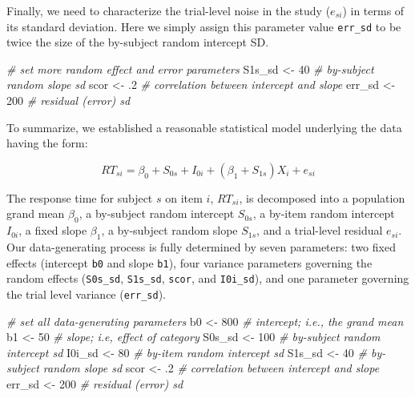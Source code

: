\documentclass[doc,floatsintext]{apa6}
\newenvironment{Shaded}{\begin{snugshade}}{\end{snugshade}}
\newcommand{\DecValTok}[1]{\textcolor[rgb]{0.00,0.00,0.81}{#1}}
\newcommand{\FloatTok}[1]{\textcolor[rgb]{0.00,0.00,0.81}{#1}}
\newcommand{\StringTok}[1]{\textcolor[rgb]{0.31,0.60,0.02}{#1}}
\newcommand{\CommentTok}[1]{\textcolor[rgb]{0.56,0.35,0.01}{\textit{#1}}}
\newcommand{\NormalTok}[1]{#1}
\begin{document}
Finally, we need to characterize the trial-level noise in the study
(\(e_{si}\)) in terms of its standard deviation. Here we simply assign
this parameter value \texttt{err\_sd} to be twice the size of the
by-subject random intercept SD.

\begin{Shaded}
\begin{Highlighting}[]
\CommentTok{# set more random effect and error parameters}
\NormalTok{S1s_sd <-}\StringTok{  }\DecValTok{40} \CommentTok{# by-subject random slope sd}
\NormalTok{scor   <-}\StringTok{  }\FloatTok{.2} \CommentTok{# correlation between intercept and slope}
\NormalTok{err_sd <-}\StringTok{ }\DecValTok{200} \CommentTok{# residual (error) sd}
\end{Highlighting}
\end{Shaded}

To summarize, we established a reasonable statistical model underlying
the data having the form:

\begin{equation}
RT_{si} = \beta_0 + S_{0s} + I_{0i} + \left(\beta_1 + S_{1s}\right) X_i + e_{si}
\end{equation}

\noindent The response time for subject \(s\) on item \(i\),
\(RT_{si}\), is decomposed into a population grand mean \(\beta_0\), a
by-subject random intercept \(S_{0s}\), a by-item random intercept
\(I_{0i}\), a fixed slope \(\beta_1\), a by-subject random slope
\(S_{1s}\), and a trial-level residual \(e_{si}\). Our data-generating
process is fully determined by seven parameters: two fixed effects
(intercept \texttt{b0} and slope \texttt{b1}), four variance parameters
governing the random effects (\texttt{S0s\_sd}, \texttt{S1s\_sd},
\texttt{scor}, and \texttt{I0i\_sd}), and one parameter governing the
trial level variance (\texttt{err\_sd}).

\begin{Shaded}
\begin{Highlighting}[]
\CommentTok{# set all data-generating parameters}
\NormalTok{b0     <-}\StringTok{ }\DecValTok{800} \CommentTok{# intercept; i.e., the grand mean}
\NormalTok{b1     <-}\StringTok{  }\DecValTok{50} \CommentTok{# slope; i.e, effect of category}
\NormalTok{S0s_sd <-}\StringTok{ }\DecValTok{100} \CommentTok{# by-subject random intercept sd}
\NormalTok{I0i_sd <-}\StringTok{  }\DecValTok{80} \CommentTok{# by-item random intercept sd}
\NormalTok{S1s_sd <-}\StringTok{  }\DecValTok{40} \CommentTok{# by-subject random slope sd}
\NormalTok{scor   <-}\StringTok{  }\FloatTok{.2} \CommentTok{# correlation between intercept and slope}
\NormalTok{err_sd <-}\StringTok{ }\DecValTok{200} \CommentTok{# residual (error) sd}
\end{Highlighting}
\end{Shaded}
\end{document}
